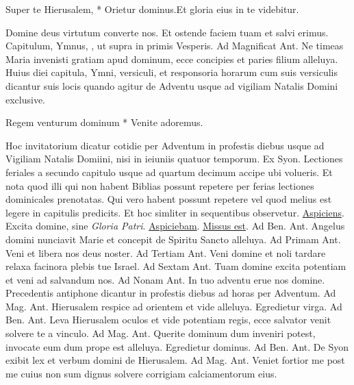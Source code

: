 \begin{multicols*}{2}
\begin{responsory-breve}
{Super te Hierusalem, * Orietur dominus.}{Et gloria eius in te videbitur.}
\end{responsory-breve}
\V Domine deus virtutum converte nos. \R Et ostende faciem tuam et salvi erimus.
 Capitulum, Ymnus, \Vbar, ut supra in primis Vesperis. {\color{Red} Ad Magnificat Ant.} Ne timeas Maria invenisti gratiam apud dominum, ecce concipies et paries filium alleluya. Huius diei capitula, Ymni, versiculi, et responsoria horarum cum suis versiculis dicantur suis locis quando agitur de Adventu usque ad vigiliam Natalis Domini exclusive.
\begin{invitatory}
{Regem venturum dominum * Venite adoremus.}
\end{invitatory}
Hoc invitatorium dicatur cotidie per Adventum in profestis diebus usque ad Vigiliam Natalis Domiini, nisi in ieiuniis quatuor temporum. \V Ex Syon.
\newline Lectiones feriales a secundo capitulo usque ad quartum decimum accipe ubi volueris. Et nota quod illi qui non habent Biblias possunt repetere per ferias lectiones dominicales prenotatas. Qui vero habent possunt repetere vel quod melius est legere in capitulis predicits. Et hoc simliter in sequentibus observetur.
\R \hyperlink{aspiciens}{Aspiciens}. \V Excita domine, sine {\itshape Gloria Patri}. \R \hyperlink{aspiciebam}{Aspiciebam}. \R \hyperlink{missus-est}{Missus est}. {\color{Red} Ad Ben. Ant.} Angelus domini nunciavit Marie et concepit de Spiritu Sancto alleluya. {\color{Red} Ad Primam Ant.} Veni et libera nos deus noster. {\color{Red} Ad Tertiam Ant.} Veni domine et noli tardare relaxa facinora plebis tue Israel. {\color{Red} Ad Sextam Ant.} Tuam domine excita potentiam et veni ad salvandum nos. {\color{Red} Ad Nonam Ant.} In tuo adventu erue nos domine.
Precedentis antiphone dicantur in profestis diebus ad horas per Adventum. {\color{Red} Ad Mag. Ant.} Hierusalem respice ad orientem et vide alleluya.
 \V Egredietur virga. {\color{Red} Ad Ben. Ant.} Leva Hierusalem oculos et vide potentiam regis, ecce salvator venit solvere te a vinculo. {\color{Red} Ad Mag. Ant.} Querite dominum dum inveniri potest, invocate eum dum prope est alleluya.
 \V Egredietur dominus. {\color{Red} Ad Ben. Ant.} De Syon exibit lex et verbum domini de Hierusalem. {\color{Red} Ad Mag. Ant.} Veniet fortior me post me cuius non sum dignus solvere corrigiam calciamentorum eius.

\end{multicols*}
